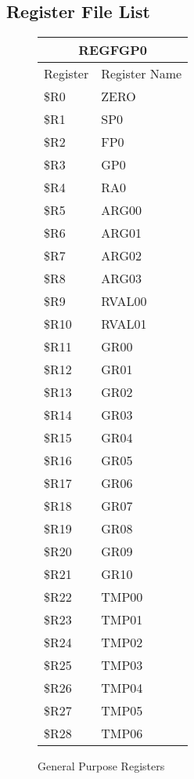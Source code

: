 \documentclass[letterpaper, 11pt]{article}
\begin{document}
\subsection{Register File List}
	\begin{figure}[!h]
		\caption{General Purpose Registers}
		\parbox{0.05\linewidth}{
			\centering
			\fontsize{6}{8}\selectfont
			\begin{tabular}{|l|l|}
				\hline
				\multicolumn{2}{|c|}{REGFGP0} \\
				\hline
				Register & Register Name \\ \hline
				\$R0  & ZERO \\ 	\hline
				\$R1  & SP0 \\ 	\hline
				\$R2  & FP0 \\ 	\hline
				\$R3  & GP0 \\ 	\hline
				\$R4  & RA0 \\ 	\hline
				\$R5  & ARG00 \\ 	\hline
				\$R6  & ARG01 \\ 	\hline
				\$R7  & ARG02 \\ 	\hline
				\$R8  & ARG03 \\ 	\hline
				\$R9  & RVAL00 \\ 	\hline
				\$R10 & RVAL01 \\ \hline
				\$R11 & GR00  \\ \hline
				\$R12 & GR01  \\ \hline
				\$R13 & GR02  \\ \hline
				\$R14 & GR03  \\ \hline
				\$R15 & GR04  \\ \hline
				\$R16 & GR05  \\ \hline
				\$R17 & GR06  \\ \hline
				\$R18 & GR07  \\ \hline
				\$R19 & GR08  \\ \hline
				\$R20 & GR09  \\ \hline
				\$R21 & GR10  \\ \hline
				\$R22 & TMP00  \\ \hline
				\$R23 & TMP01 \\ \hline
				\$R24 & TMP02  \\ \hline
				\$R25 & TMP03  \\ \hline
				\$R26 & TMP04  \\ \hline
				\$R27 & TMP05  \\ \hline
				\$R28 & TMP06  \\ \hline

\end{tabular}}
\end{figure}
\end{document}

